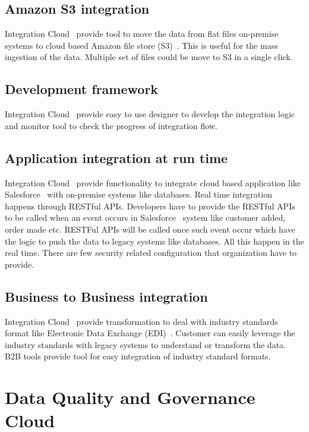 \subsection{Amazon S3 integration}

Integration Cloud~\cite{hid-sp18-511-iics} provide tool to move the data from flat files on-premise systems to cloud based Amazon file store (S3)~\cite{hid-sp18-511-aws-s3}. This is useful for the mass ingestion of the data. Multiple set of files could be move to S3 in a single click.

\subsection{Development framework}

Integration Cloud~\cite{hid-sp18-511-iics} provide easy to use designer to develop the integration logic and monitor tool to check the progress of integration flow.

\subsection{Application integration at run time}

Integration Cloud~\cite{hid-sp18-511-iics} provide functionality to integrate cloud based application like Salesforce~\cite{hid-sp18-511-salesforce} with on-premise systems like databases. Real time integration happens through RESTful APIs. Developers have to provide the RESTful APIs to be called when an event occurs in Salesforce~\cite{hid-sp18-511-salesforce} system like customer added, order made etc. RESTFul APIs will be called once such event occur which have the logic to push the data to legacy systems like databases. All this happen in the real time. There are few security related configuration that organization have to provide.

\subsection{Business to Business integration}

Integration Cloud~\cite{hid-sp18-511-iics} provide transformation to deal with industry standards format like Electronic Data Exchange (EDI)~\cite{hid-sp18-511-edi}. Customer can easily leverage the industry standards with legacy systems to understand or transform the data. B2B tools provide tool for easy integration of industry standard formats.

\section{Data Quality and Governance Cloud}

